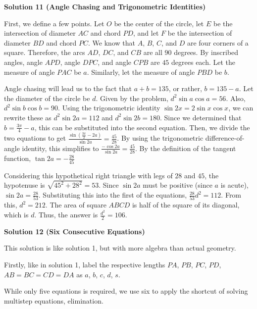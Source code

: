 \begin{enumerate}
 


 



\textbf{Solution 11 (Angle Chasing and Trigonometric Identities)}

First, we define a few points. Let $O$ be the center of the circle, let $E$ be the intersection of diameter $AC$ and chord $PD$, and let $F$ be the intersection of diameter $BD$ and chord $PC$. We know that $A$, $B$, $C$, and $D$ are four corners of a square. Therefore, the arcs $AD$, $DC$, and $CB$ are all $90$ degrees. By inscribed angles, angle $APD$, angle $DPC$, and angle $CPB$ are $45$ degrees each. Let the measure of angle $PAC$ be $a$. Similarly, let the measure of angle $PBD$ be $b$. 

 
Angle chasing will lead us to the fact that $a + b = 135$, or rather, $b = 135-a$. Let the diameter of the circle be $d$. Given by the problem, $d^2\sin a \cos a = 56$. Also, $d^2\sin b \cos b = 90$. Using the trigonometric identity $\sin 2x = 2\sin x \cos x$, we can rewrite these as $d^2\sin 2a = 112$ and $d^2\sin 2b = 180$. Since we determined that $b = \frac{3\pi}{4}-a$, this can be substituted into the second equation. Then, we divide the two equations to get $\frac{\sin (\frac{3\pi}{2}-2a)}{\sin 2a} = \frac{45}{28}$. By using the trigonometric difference-of-angle identity, this simplifies to $\frac{-\cos 2a}{\sin 2a} = \frac{45}{28}$. By the definition of the tangent function, $\tan 2a = -\frac{28}{45}$

 
Considering this hypothetical right triangle with legs of $28$ and $45$, the hypotenuse is $\sqrt{45^2+28^2} = 53$. Since $\sin 2a$ must be positive (since $a$ is acute), $\sin 2a = \frac{28}{53}$. Substituting this into the first of the equations, $\frac{28}{53}d^2 = 112$. From this, $d^2 = 212$. The area of square $ABCD$ is half of the square of its diagonal, which is $d$. Thus, the answer is $\frac{d^2}{2} = \boxed{106}$.

 



\textbf{Solution 12 (Six Consecutive Equations)}

This solution is like solution 1, but with more algebra than actual geometry.

 Firstly, like in solution 1, label the respective lengths $PA$, $PB$, $PC$, $PD$, $AB = BC = CD = DA$ as $a$, $b$, $c$, $d$, $s$.

 While only five equations is required, we use six to apply the shortcut of solving multistep equations, elimination.


\end{enumerate}
